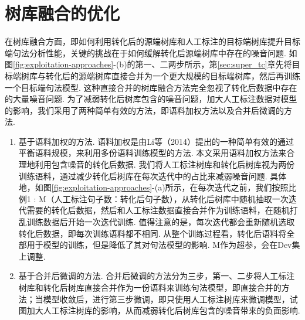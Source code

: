 \section{树库融合的优化}
在树库融合方面，即如何利用转化后的源端树库和人工标注的目标端树库提升目标端句法分析性能，关键的挑战在于如何缓解转化后源端树库中存在的噪音问题.
如图\ref{fig:exploitation-approaches}-(b)的第一、二两步所示，第\ref{sec:super_tc}章先将目标端树库与转化后的源端树库直接合并为一个更大规模的目标端树库，然后再训练一个目标端句法模型. 这种直接合并的树库融合方法完全忽视了转化后数据中存在的大量噪音问题.
为了减弱转化后树库包含的噪音问题，加大人工标注数据对模型的影响，我们采用了两种简单有效的方法，即语料加权方法以及合并后微调的方法.
\begin{enumerate}
    \item 基于语料加权的方法. 语料加权是由Li等（2014）提出的一种简单有效的通过平衡语料规模，来利用多份语料训练模型的方法. 本文采用语料加权方法来合理地利用包含噪音的转化后数据. 我们将人工标注树库和转化后树库视为两份训练语料，通过减少转化后树库在每次迭代中的占比来减弱噪音问题. 具体地，如图\ref{fig:exploitation-approaches}-(a)所示，在每次迭代之前，我们按照比例1 : M（人工标注句子数：转化后句子数），从转化后树库中随机抽取一次迭代需要的转化后数据，然后和人工标注数据直接合并作为训练语料，在随机打乱训练数据后开始一次迭代训练. 值得注意的是，每次迭代都会重新随机选取转化后数据，即每次训练语料都不相同. 从整个训练过程看，转化后语料将全部用于模型的训练，但是降低了其对句法模型的影响. M作为超参，会在Dev集上调整.
    \item 基于合并后微调的方法. 合并后微调的方法分为三步，第一、二步将人工标注树库和转化后树库直接合并作为一份语料来训练句法模型，即直接合并的方法；当模型收敛后，进行第三步微调，即只使用人工标注树库来微调模型，试图加大人工标注树库的影响，从而减弱转化后树库包含的噪音带来的负面影响.
\end{enumerate}

